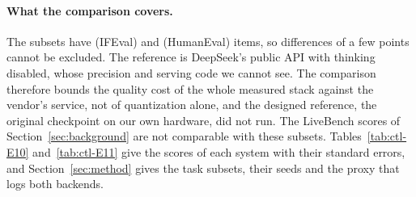 \paragraph{What the comparison covers.}
The subsets have  (IFEval) and  (HumanEval) items, so differences of
a few points cannot be excluded. The reference is DeepSeek's public API with thinking disabled, whose precision and
serving code we cannot see. The comparison therefore bounds the quality cost of the whole measured stack against the
vendor's service, not of quantization alone, and the designed reference, the original checkpoint on our own hardware,
did not run. The LiveBench scores of Section~\ref{sec:background} are not comparable with these subsets.
Tables~\ref{tab:ctl-E10} and~\ref{tab:ctl-E11} give the scores of each system with their standard errors, and
Section~\ref{sec:method} gives the task subsets, their seeds and the proxy that logs both backends.





